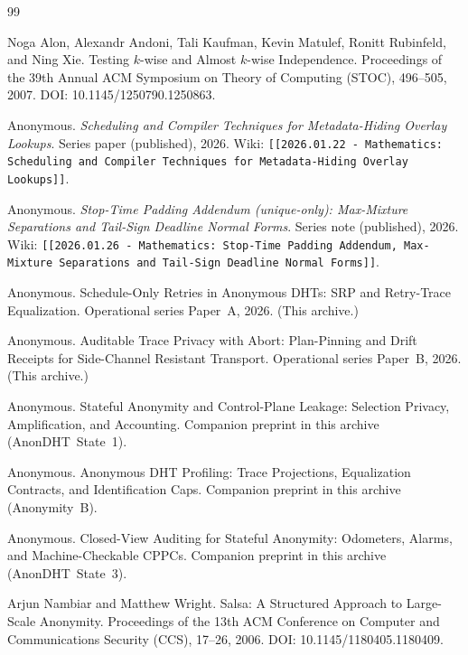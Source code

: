 \documentclass[11pt]{article}
\begin{document}
\begin{thebibliography}{99}\small

Noga Alon, Alexandr Andoni, Tali Kaufman, Kevin Matulef, Ronitt Rubinfeld, and Ning Xie.
\newblock Testing $k$-wise and Almost $k$-wise Independence.
\newblock Proceedings of the 39th Annual ACM Symposium on Theory of Computing (STOC), 496--505, 2007.
\newblock DOI: 10.1145/1250790.1250863.

Anonymous.
\newblock \emph{Scheduling and Compiler Techniques for Metadata-Hiding Overlay Lookups}.
\newblock Series paper (published), 2026.
\newblock Wiki: \texttt{[[2026.01.22 - Mathematics: Scheduling and Compiler Techniques for Metadata-Hiding Overlay Lookups]]}.

Anonymous.
\newblock \emph{Stop-Time Padding Addendum (unique-only): Max-Mixture Separations and Tail-Sign Deadline Normal Forms}.
\newblock Series note (published), 2026.
\newblock Wiki: \texttt{[[2026.01.26 - Mathematics: Stop-Time Padding Addendum, Max-Mixture Separations and Tail-Sign Deadline Normal Forms]]}.

Anonymous.
\newblock Schedule-Only Retries in Anonymous DHTs: SRP and Retry-Trace Equalization.
\newblock Operational series Paper~A, 2026. (This archive.)

Anonymous.
\newblock Auditable Trace Privacy with Abort: Plan-Pinning and Drift Receipts for Side-Channel Resistant Transport.
\newblock Operational series Paper~B, 2026. (This archive.)

Anonymous.
\newblock Stateful Anonymity and Control-Plane Leakage: Selection Privacy, Amplification, and Accounting.
\newblock Companion preprint in this archive (AnonDHT~State~1).

Anonymous.
\newblock Anonymous DHT Profiling: Trace Projections, Equalization Contracts, and Identification Caps.
\newblock Companion preprint in this archive (Anonymity~B).

Anonymous.
\newblock Closed-View Auditing for Stateful Anonymity: Odometers, Alarms, and Machine-Checkable CPPCs.
\newblock Companion preprint in this archive (AnonDHT~State~3).

Arjun Nambiar and Matthew Wright.
\newblock Salsa: A Structured Approach to Large-Scale Anonymity.
\newblock Proceedings of the 13th ACM Conference on Computer and Communications Security (CCS), 17--26, 2006.
\newblock DOI: 10.1145/1180405.1180409.


\end{thebibliography}
\end{document}
